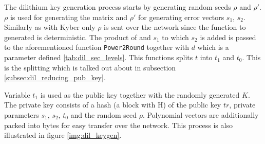 The dilithium key generation process starts by generating random seeds $\rho$ and $\rho'$. $\rho$ is used for generating the matrix  and $\rho'$ for generating error vectors $s_1$, $s_2$. Similarly as with Kyber only $\rho$ is sent over the network since the function to generated  is deterministic. The product of  and $s_1$ to which $s_2$ is added is passed to the aforementioned function \texttt{Power2Round} together with $d$ which is a parameter defined \ref{tab:dil_sec_levels}. This functions splits $t$ into $t_1$ and $t_0$. This is the splitting which is talked out about in subsection \ref{subsec:dil_reducing_pub_key}.

Variable $t_1$ is used as the public key together with the randomly generated $K$. The private key consists of a hash (a block with H) of the public key $tr$, private parameters $s_1$, $s_2$, $t_0$ and the random seed $\rho$. Polynomial vectors are additionally packed into bytes for easy transfer over the network. This process is also illustrated in figure \ref{img:dil_keygen}.

